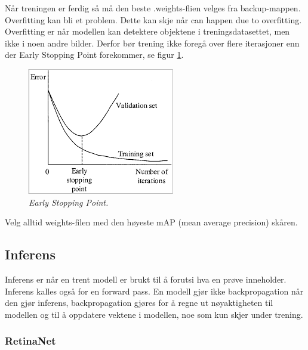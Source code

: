 Når treningen er ferdig så må den beste .weights-flien velges fra backup-mappen. Overfitting kan bli et problem. Dette kan skje når  can happen due to overfitting. Overfitting er når modellen kan detektere objektene i treningsdatasettet, men ikke i noen andre bilder. Derfor bør trening ikke foregå over flere iterasjoner enn der Early Stopping Point forekommer, se figur \ref{fig:early_stopping_point}.

\begin{figure}[h!]
\begin{center} 
\includegraphics[scale=1.0]{figures/early_stopping_point}
\caption{\small \sl Early Stopping Point. \label{fig:early_stopping_point}}
\end{center}
\end{figure}

Velg alltid weights-filen med den høyeste mAP (mean average precision) skåren.


\subsection{Inferens}

Inferens er når en trent modell er brukt til å forutsi hva en prøve inneholder. Inferens kalles også for en forward pass. En modell gjør ikke backpropagation når den gjør inferens, backpropagation gjøres for å regne ut nøyaktigheten til modellen og til å oppdatere vektene i modellen, noe som kun skjer under trening. 

\subsubsection{RetinaNet}

